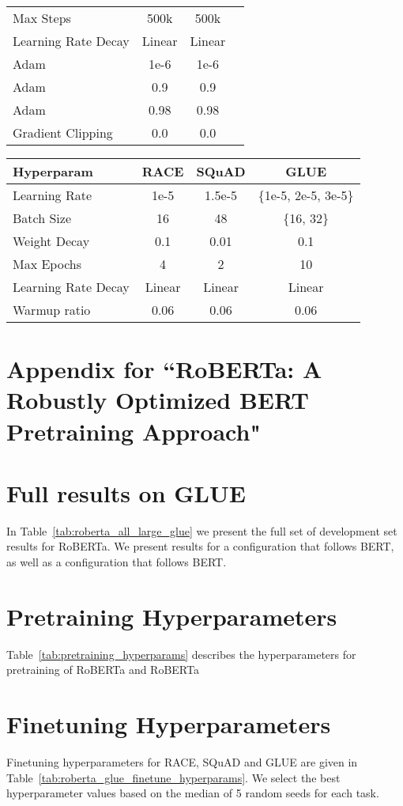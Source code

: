 \documentclass[11pt]{article}
\newcommand{\ourmodel}{RoBERTa}
\newcommand{\ourmodelbase}{RoBERTa}
\newcommand{\ourmodellarge}{RoBERTa}
\newcommand{\bertbase}{BERT}
\newcommand{\bertlarge}{BERT}
\begin{document}
\begin{table*}[t]
\begin{center}
\begin{tabular}{lccc}
Max Steps & 500k & 500k\\
Learning Rate Decay & Linear & Linear \\
Adam  & 1e-6 & 1e-6 \\
Adam  & 0.9 & 0.9 \\
Adam  & 0.98 & 0.98 \\
Gradient Clipping & 0.0 & 0.0 \\
\bottomrule
\end{tabular}
\end{center}
\caption{
Hyperparameters for pretraining \ourmodellarge{} and \ourmodelbase{}.
}
\label{tab:pretraining_hyperparams}
\end{table*} \begin{table*}[t]
\begin{center}
\begin{tabular}{lccc}
\toprule
\bf Hyperparam  & \bf RACE & \bf SQuAD & \bf GLUE \\
\midrule 
Learning Rate & 1e-5 & 1.5e-5 & \{1e-5, 2e-5, 3e-5\}\\
Batch Size & 16 & 48  & \{16, 32\}\\
Weight Decay & 0.1 & 0.01 & 0.1 \\
Max Epochs & 4 & 2 & 10 \\
Learning Rate Decay & Linear &Linear & Linear \\
Warmup ratio & 0.06 & 0.06 & 0.06 \\
\bottomrule
\end{tabular}
\end{center}
\caption{
Hyperparameters for finetuning \ourmodellarge{} on RACE, SQuAD and GLUE.
}
\label{tab:roberta_glue_finetune_hyperparams}
\end{table*} 
\section*{Appendix for ``RoBERTa: A Robustly Optimized BERT Pretraining Approach"}

\section{Full results on GLUE}

In Table~\ref{tab:roberta_all_large_glue} we present the full set of development set results for \ourmodel{}.
We present results for a  configuration that follows \bertlarge{}, as well as a  configuration that follows \bertbase{}.

\section{Pretraining Hyperparameters}
Table~\ref{tab:pretraining_hyperparams} describes the hyperparameters for pretraining of \ourmodellarge{} and \ourmodelbase{} 

\section{Finetuning Hyperparameters}
\label{app:hyperparams}

Finetuning hyperparameters for RACE, SQuAD and GLUE are given in  Table~\ref{tab:roberta_glue_finetune_hyperparams}.
We select the best hyperparameter values based on the median of 5 random seeds for each task.




 
\end{document}
